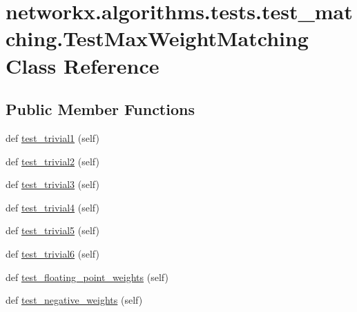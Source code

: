 \hypertarget{classnetworkx_1_1algorithms_1_1tests_1_1test__matching_1_1TestMaxWeightMatching}{}\section{networkx.\+algorithms.\+tests.\+test\+\_\+matching.\+Test\+Max\+Weight\+Matching Class Reference}
\label{classnetworkx_1_1algorithms_1_1tests_1_1test__matching_1_1TestMaxWeightMatching}
\subsection*{Public Member Functions}
\begin{DoxyCompactItemize}
\item 
def \hyperlink{classnetworkx_1_1algorithms_1_1tests_1_1test__matching_1_1TestMaxWeightMatching_ad23c3e38262a1695003ff6b872f6e3b5}{test\+\_\+trivial1} (self)
\item 
def \hyperlink{classnetworkx_1_1algorithms_1_1tests_1_1test__matching_1_1TestMaxWeightMatching_a2519cc0ead77b9605127fd210875a55c}{test\+\_\+trivial2} (self)
\item 
def \hyperlink{classnetworkx_1_1algorithms_1_1tests_1_1test__matching_1_1TestMaxWeightMatching_a71519d2db1ac1fca08308d02c868ca97}{test\+\_\+trivial3} (self)
\item 
def \hyperlink{classnetworkx_1_1algorithms_1_1tests_1_1test__matching_1_1TestMaxWeightMatching_af47ae82102a41d89df8b1d4490994c3e}{test\+\_\+trivial4} (self)
\item 
def \hyperlink{classnetworkx_1_1algorithms_1_1tests_1_1test__matching_1_1TestMaxWeightMatching_af57d7cc08d13b5714cfa62c84e556d32}{test\+\_\+trivial5} (self)
\item 
def \hyperlink{classnetworkx_1_1algorithms_1_1tests_1_1test__matching_1_1TestMaxWeightMatching_aa315011e58aeced88a2e413491b742d7}{test\+\_\+trivial6} (self)
\item 
def \hyperlink{classnetworkx_1_1algorithms_1_1tests_1_1test__matching_1_1TestMaxWeightMatching_a268bb9a4865eac1ca95651f0f6d3034d}{test\+\_\+floating\+\_\+point\+\_\+weights} (self)
\item 
def \hyperlink{classnetworkx_1_1algorithms_1_1tests_1_1test__matching_1_1TestMaxWeightMatching_a4c12feb485408256a2e807672095a526}{test\+\_\+negative\+\_\+weights} (self)
\item 

\end{DoxyCompactItemize}
